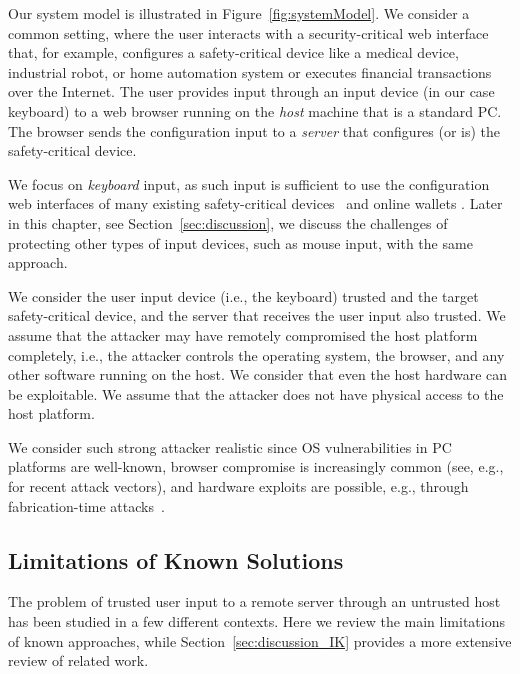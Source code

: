 Our system model is illustrated in Figure~\ref{fig:systemModel}. We consider a common setting, where the user interacts with a security-critical web interface that, for example, configures a safety-critical device like a medical device, industrial robot, or home automation system or executes financial transactions over the Internet. The user provides input through an input device (in our case keyboard) to a web browser running on the \emph{host} machine that is a standard PC. The browser sends the configuration input to a \emph{server} that configures (or is) the safety-critical device.

We focus on \emph{keyboard} input, as such input is sufficient to use the configuration web interfaces of many existing safety-critical devices~\cite{7306669,controlbyweb,siemens,siemens2,schneider} and online wallets \cite{bitgo,bitcoinwallet,coin,blockchain,coinbase}. Later in this chapter, see Section~\ref{sec:discussion}, we discuss the challenges of protecting other types of input devices, such as mouse input, with the same approach.

 We consider the user input device (i.e., the keyboard) trusted and the target safety-critical device, and the server that receives the user input also trusted. We assume that the attacker may have remotely compromised the host platform completely, i.e., the attacker controls the operating system, the browser, and any other software running on the host. We consider that even the host hardware can be exploitable. We assume that the attacker does not have physical access to the host platform.

We consider such strong attacker realistic since OS vulnerabilities in PC platforms are well-known, browser compromise is increasingly common (see, e.g.,~\cite{provos2007ghost,dougan2012man} for recent attack vectors), and hardware exploits are possible, e.g., through fabrication-time attacks~\cite{Lin2009,a2}. 

\subsection{Limitations of Known Solutions}

The problem of trusted user input to a remote server through an untrusted host has been studied in a few different contexts. Here we review the main limitations of known approaches, while Section~\ref{sec:discussion_IK} provides a more extensive review of related work.

